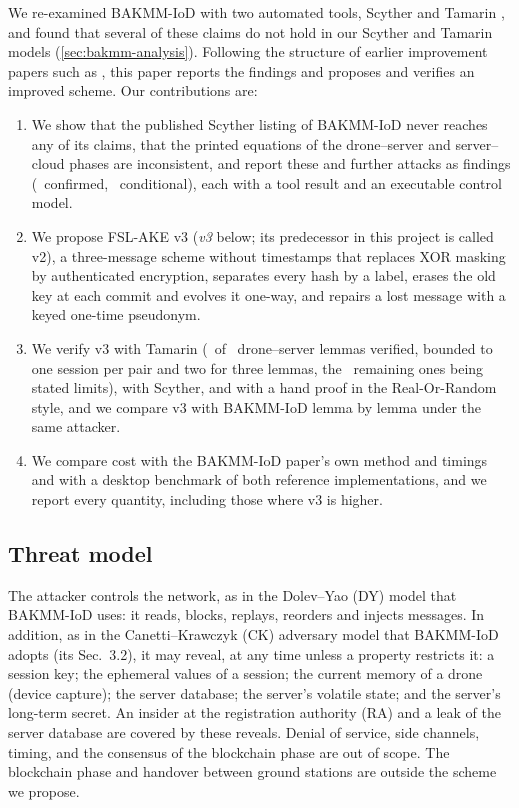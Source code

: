 We re-examined BAKMM-IoD with two automated tools, Scyther \citep{cremers2008} and Tamarin \citep{meier2013}, and found that several of these claims do not hold in our Scyther and Tamarin models
(\cref{sec:bakmm-analysis}). Following the structure of earlier improvement papers such as \citet{li2024}, this paper reports
the findings and proposes and verifies an improved scheme. Our contributions are:
\begin{enumerate}
  \item We show that the published Scyther listing of BAKMM-IoD never reaches any of its claims, that the printed equations of
        the drone--server and server--cloud phases are inconsistent, and report these and further attacks as findings
        (\NumFlawsConfirmed\ confirmed, \NumFlawsConditional\ conditional), each with a tool result and an executable control model.
  \item We propose FSL-AKE v3 (\emph{v3} below; its predecessor in this project is called v2), a three-message scheme without timestamps that replaces XOR masking by authenticated
        encryption, separates every hash by a label, erases the old key at each commit and evolves it one-way, and repairs a
        lost message with a keyed one-time pseudonym.
  \item We verify v3 with Tamarin (\NumVthreeVerified\ of \NumVthreeLemmas\ drone--server lemmas verified, bounded to one
        session per pair and two for three lemmas, the
        \NumVthreeFalsified\ remaining ones being stated limits), with Scyther, and with a hand proof in the Real-Or-Random style,
        and we compare v3 with BAKMM-IoD lemma by lemma under the same attacker.
  \item We compare cost with the BAKMM-IoD paper's own method and timings and with a desktop benchmark of both reference
        implementations, and we report every quantity, including those where v3 is higher.
\end{enumerate}

\subsection{Threat model}\label{sec:threat}
The attacker controls the network, as in the Dolev--Yao (DY) model \citep{dolev1983} that BAKMM-IoD uses: it reads, blocks,
replays, reorders and injects messages. In addition, as in the Canetti--Krawczyk (CK) adversary model \citep{canetti2001} that
BAKMM-IoD adopts (its Sec.~3.2), it may reveal, at any time unless a
property restricts it: a session key; the ephemeral values of a session; the current memory of a drone (device capture); the
server database; the server's volatile state; and the server's long-term secret. An insider at the registration authority
(RA) and a leak of the server database are covered by these reveals. Denial of service, side channels, timing, and the
consensus of the blockchain phase are out of scope. The blockchain phase and handover between ground stations are outside the
scheme we propose.


